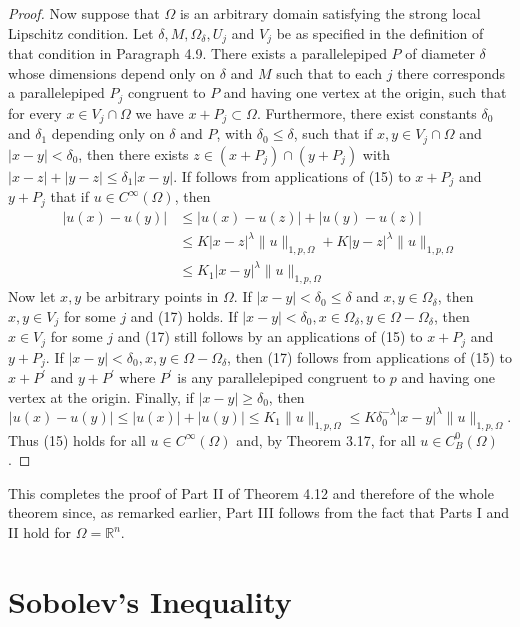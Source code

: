 \begin{proof}
  Now suppose that $\Omega$ is an arbitrary domain satisfying the strong local Lipschitz condition. Let $\delta, M, \Omega_\delta, U_j$ and $V_j$ be as specified in the definition of that condition in Paragraph 4.9. There exists a parallelepiped $P$ of diameter $\delta$ whose dimensions depend only on $\delta$ and $M$ such that to each $j$ there corresponds a parallelepiped $P_j$ congruent to $P$ and having one vertex at the origin, such that for every $x \in V_j \cap \Omega$ we have $x+P_j \subset \Omega$. Furthermore, there exist constants $\delta_0$ and $\delta_1$ depending only on $\delta$ and $P$, with $\delta_0 \leq \delta$, such that if $x, y \in V_j \cap \Omega$ and $|x-y|<\delta_0$, then there exists $z \in\left(x+P_j\right) \cap\left(y+P_j\right)$ with $|x-z|+|y-z| \leq \delta_1|x-y|$. If follows from applications of (15) to $x+P_j$ and $y+P_j$ that if $u \in C^{\infty}(\Omega)$, then
  \[
  \begin{aligned}
  |u(x)-u(y)| & \leq|u(x)-u(z)|+|u(y)-u(z)| \\
  & \leq K|x-z|^\lambda\|u\|_{1, p, \Omega}+K|y-z|^\lambda\|u\|_{1, p, \Omega} \\
  & \leq K_1|x-y|^\lambda\|u\|_{1, p, \Omega}
  \end{aligned}
  \]
  Now let $x, y$ be arbitrary points in $\Omega$. If $|x-y|<\delta_0 \leq \delta$ and $x, y \in \Omega_\delta$, then $x, y \in V_j$ for some $j$ and (17) holds. If $|x-y|<\delta_0, x \in \Omega_\delta, y \in \Omega-\Omega_\delta$, then $x \in V_j$ for some $j$ and (17) still follows by an applications of (15) to $x+P_j$ and $y+P_j$. If $|x-y|<\delta_0, x, y \in \Omega-\Omega_\delta$, then (17) follows from applications
  of (15) to $x+P^{\prime}$ and $y+P^{\prime}$ where $P^{\prime}$ is any parallelepiped congruent to $p$ and having one vertex at the origin. Finally, if $|x-y| \geq \delta_0$, then
  \[
  |u(x)-u(y)| \leq|u(x)|+|u(y)| \leq K_1\|u\|_{1, p, \Omega} \leq K \delta_0^{-\lambda}|x-y|^\lambda\|u\|_{1, p, \Omega} .
  \]
  Thus (15) holds for all $u \in C^{\infty}(\Omega)$ and, by Theorem 3.17, for all $u \in C_B^0(\Omega)$.
\end{proof}

This completes the proof of Part II of Theorem 4.12 and therefore of the whole theorem since,
as remarked earlier, Part III follows from the fact that Parts I and II hold
for $\Omega=\mathbb{R}^n$.


\section{Sobolev's Inequality}


